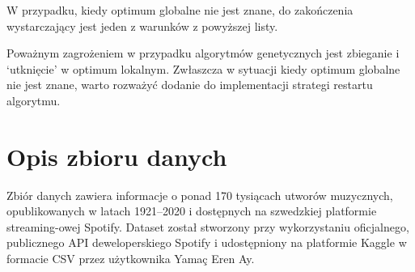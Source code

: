 \documentclass[a4paper,12pt]{article}
\numberwithin{figure}{section}
\begin{document}
    \bigskip

    W przypadku, kiedy optimum globalne nie jest znane, do zakończenia wystarczający jest jeden z warunków z powyższej listy\cite{IntroductionToEvolutionaryComputing2015}.

    \bigskip

    Poważnym zagrożeniem w przypadku algorytmów genetycznych jest zbieganie i `utknięcie' w optimum lokalnym. Zwłaszcza w sytuacji kiedy optimum globalne nie jest znane, warto rozważyć dodanie do implementacji strategi restartu algorytmu\cite{GeneticAlgorithmEssentials2017}.

    \newpage


    \section{Opis zbioru danych}

    Zbiór danych zawiera informacje o ponad 170 tysiącach utworów muzycznych, opublikowanych w latach 1921--2020 i dostępnych na szwedzkiej platformie streaming-owej Spotify. Dataset został stworzony przy wykorzystaniu oficjalnego, publicznego API deweloperskiego Spotify i udostępniony na platformie Kaggle w formacie CSV przez użytkownika Yamaç Eren Ay\cite{SpotifyKaggleDataset2020}.

    \bigskip
\end{document}
